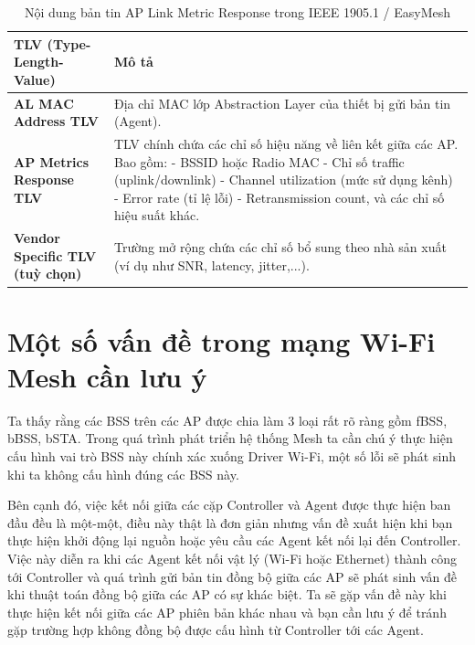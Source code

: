 \begin{table}[ht]
\centering
\caption{Nội dung bản tin AP Link Metric Response trong IEEE 1905.1 / EasyMesh}
\begin{tabular}{|>{\raggedright\arraybackslash}m{5cm}|>{\raggedright\arraybackslash}m{8cm}|}
\hline
\textbf{TLV (Type-Length-Value)} & \textbf{Mô tả} \\
\hline
\textbf{AL MAC Address TLV} & Địa chỉ MAC lớp Abstraction Layer của thiết bị gửi bản tin (Agent). \\
\hline
\textbf{AP Metrics Response TLV} & TLV chính chứa các chỉ số hiệu năng về liên kết giữa các AP. Bao gồm: \newline
- BSSID hoặc Radio MAC \newline
- Chỉ số traffic (uplink/downlink) \newline
- Channel utilization (mức sử dụng kênh) \newline
- Error rate (tỉ lệ lỗi) \newline
- Retransmission count, và các chỉ số hiệu suất khác. \\
\hline
\textbf{Vendor Specific TLV (tuỳ chọn)} & Trường mở rộng chứa các chỉ số bổ sung theo nhà sản xuất (ví dụ như SNR, latency, jitter,...). \\
\hline
\end{tabular}
\end{table}

\section{Một số vấn đề trong mạng Wi-Fi Mesh cần lưu ý}
Ta thấy rằng các BSS trên các AP được chia làm 3 loại rất rõ ràng gồm fBSS, bBSS, bSTA. Trong quá trình phát triển hệ thống Mesh ta cần chú ý thực hiện cấu hình vai trò BSS này chính xác xuống Driver Wi-Fi, một số lỗi sẽ phát sinh khi ta không cấu hình đúng các BSS này. 

Bên cạnh đó, việc kết nối giữa các cặp Controller và Agent được thực hiện ban đầu đều là một-một, điều này thật là đơn giản nhưng vấn đề xuất hiện khi bạn thực hiện khởi động lại nguồn hoặc yêu cầu các Agent kết nối lại đến Controller. Việc này diễn ra khi các Agent kết nối vật lý (Wi-Fi hoặc Ethernet) thành công tới Controller và quá trình gửi bản tin đồng bộ giữa các AP sẽ phát sinh vấn đề khi thuật toán đồng bộ giữa các AP có sự khác biệt. Ta sẽ gặp vấn đề này khi thực hiện kết nối giữa các AP phiên bản khác nhau và bạn cần lưu ý để tránh gặp trường hợp không đồng bộ được cấu hình từ Controller tới các Agent.

